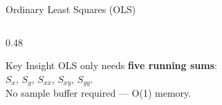 \documentclass[aspectratio=169, 10pt]{beamer}
\begin{document}
\begin{frame}{Ordinary Least Squares (OLS)}
\begin{columns}[T]
\begin{column}{0.48\textwidth}
\begin{center}
\end{center}

\vspace{0.5em}
\begin{block}{Key Insight}
OLS only needs \textbf{five running sums}:\\
$S_x$, $S_y$, $S_{xx}$, $S_{xy}$, $S_{yy}$.\\
No sample buffer required --- O(1) memory.
\end{block}
\end{column}
\end{columns}
\end{frame}
\end{document}
